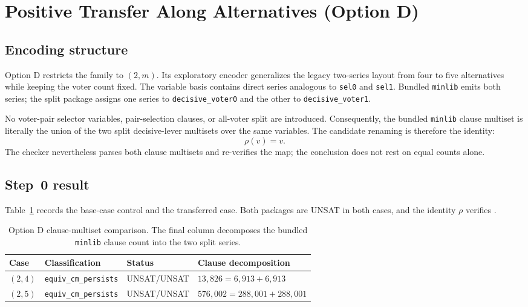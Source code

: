 \section{Positive Transfer Along Alternatives (Option D)}\label{sec:option-d}

\subsection{Encoding structure}

Option D restricts the family to $(2,m)$.  Its exploratory encoder generalizes
the legacy two-series layout from four to five alternatives while keeping the
voter count fixed.  The variable basis contains direct series analogous to
\texttt{sel0} and \texttt{sel1}.  Bundled \texttt{minlib} emits both series;
the split package assigns one series to
\texttt{decisive\_voter0} and the other to
\texttt{decisive\_voter1}.

No voter-pair selector variables, pair-selection clauses, or all-voter split
are introduced.  Consequently, the bundled \texttt{minlib} clause multiset is
literally the union of the two split decisive-lever multisets over the same
variables.  The candidate renaming is therefore the identity:
\[
  \rho(v)=v.
\]
The checker nevertheless parses both clause multisets and re-verifies the map;
the conclusion does not rest on equal counts alone.

\subsection{Step~0 result}

Table~\ref{tab:option-d-step0} records the base-case control and the transferred
case.  Both packages are UNSAT in both cases, and the identity $\rho$ verifies
\CM.

\begin{table}[ht]
\centering
\caption{Option D clause-multiset comparison.  The final column decomposes the
bundled \texttt{minlib} clause count into the two split series.}\label{tab:option-d-step0}
\begin{tabular}{llll}
\toprule
Case & Classification & Status & Clause decomposition \\
\midrule
$(2,4)$ & \texttt{equiv\_cm\_persists} & UNSAT/UNSAT
  & $13{,}826=6{,}913+6{,}913$ \\
$(2,5)$ & \texttt{equiv\_cm\_persists} & UNSAT/UNSAT
  & $576{,}002=288{,}001+288{,}001$ \\
\bottomrule
\end{tabular}
\end{table}

